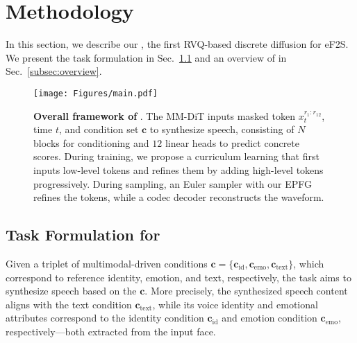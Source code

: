 \section{Methodology}
\label{sec:method}
In this section, we describe our \methodname, the first RVQ-based discrete diffusion for eF2S. 
We present the task  formulation in Sec.~\ref{subsec:task} and an overview of \methodname in Sec.~\ref{subsec:overview}. 

\begin{figure*}[t]
    \centering
    \texttt{[image: Figures/main.pdf]}
    \caption{\textbf{Overall framework of \methodname}. The MM-DiT inputs masked token $x_t^{r_1:r_{12}}$, time $t$, and condition set $\bm{c}$ to synthesize speech, consisting of $N$ blocks for conditioning and $12$ linear heads to predict concrete scores. 
    During training, we propose a curriculum learning that first inputs low-level tokens and refines them by adding high-level tokens progressively. 
    During sampling, an Euler sampler with our EPFG refines the tokens, while a codec decoder reconstructs the waveform. }
    \label{fig:main}
\end{figure*}

\subsection{Task Formulation for \taskname}
\label{subsec:task}
Given a triplet of multimodal-driven conditions $\bm{c} = \{\bm{c}_\text{id}, \bm{c}_\text{emo}, \bm{c}_\text{text}\}$, which  correspond to reference identity, emotion, and text, respectively, the \taskname task aims to synthesize speech based on the $\bm{c}$. 
More precisely, the synthesized speech content aligns with the text condition  $\bm{c}_\text{text}$, while its voice identity and emotional attributes correspond to  the identity condition $\bm{c}_\text{id}$ and emotion condition $\bm{c}_\text{emo}$, respectively---both extracted from the input face. 



